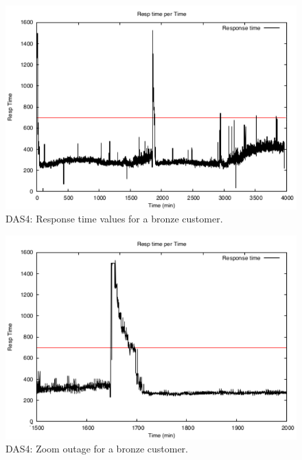 \begin{figure}
  \begin{center}
    \includegraphics[width=.85\linewidth]{images/exps2011/low/das/proxyDataPoints_output.pdf}
  \end{center}
\vspace{-5mm}
  \caption{DAS4: Response time values for a bronze customer.}
  \label{lowResponseTime}
\end{figure}

\begin{figure}
  \begin{center}
    \includegraphics[width=.85\linewidth]{images/exps2011/low/das/proxyDataPoints_output_filtered.pdf}
  \end{center}
\vspace{-5mm}
  \caption{DAS4: Zoom outage for a bronze customer.}
  \label{zoomOutage}
\end{figure}

